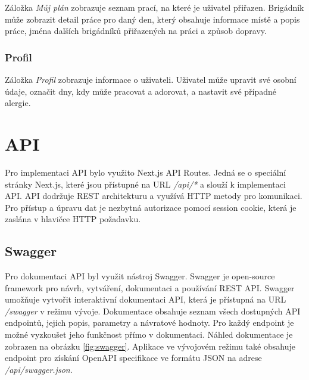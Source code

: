 Záložka \textit{Můj plán} zobrazuje seznam prací, na které je uživatel přiřazen. Brigádník může zobrazit detail práce pro daný den,
který obsahuje informace místě a popis práce, jména dalších brigádníků přiřazených na práci a způsob dopravy.

\subsubsection{Profil}

Záložka \textit{Profil} zobrazuje informace o uživateli. Uživatel může upravit své osobní údaje, označit dny, kdy může pracovat a adorovat,
a nastavit své případné alergie.

\section{API}

Pro implementaci API bylo využito Next.js API Routes. Jedná se o speciální stránky Next.js, které jsou přístupné na URL \textit{/api/*} a slouží k implementaci API.
API dodržuje REST architekturu a využívá HTTP metody pro komunikaci. Pro přístup a úpravu dat je nezbytná autorizace pomocí session cookie, která je zaslána v hlavičce HTTP požadavku.

\subsection{Swagger}

Pro dokumentaci API byl využit nástroj Swagger. Swagger je open-source framework pro návrh, vytváření, dokumentaci a používání REST API.
Swagger umožňuje vytvořit interaktivní dokumentaci API, která je přístupná na URL \textit{/swagger} v režimu vývoje. Dokumentace obsahuje seznam všech dostupných
API endpointů, jejich popis, parametry a návratové hodnoty. Pro každý endpoint je možné vyzkoušet jeho funkčnost přímo v dokumentaci.
Náhled dokumentace je zobrazen na obrázku \ref{fig:swagger}.
Aplikace ve vývojovém režimu také obsahuje endpoint pro získání OpenAPI specifikace ve formátu JSON na adrese \textit{/api/swagger.json}.

